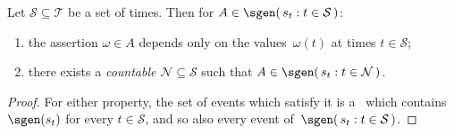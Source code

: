 \begin	{proposition}
Let \( \mathcal S \subseteq \mathcal T \) be a set of times.
Then for \( A \in \sgen(\, s_t : t \in \mathcal S \,) \):
\begin	{enumerate}
\item	the assertion \( \omega \in A \) depends only on the values~$\omega(t)$
	at times \( t \in \mathcal S \);
\item	there exists a \emph{countable} \( \mathcal N \subseteq \mathcal S \)
	such that \( A \in \sgen(\, s_t : t \in \mathcal N \,) \).
\end	{enumerate}
\end	{proposition}
\begin	{proof}
For either property, the set of events which satisfy it
is a \salg\ which contains $\sgen(s_t)$ for every \( t \in \mathcal S \),
and so also every event of~\( \sgen(\, s_t : t \in \mathcal S \,) \).
\end	{proof}
